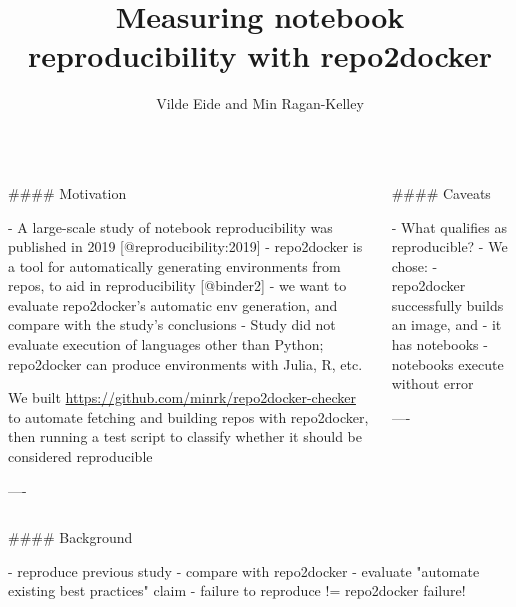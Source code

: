 \documentclass{beamer}
\author[]{Vilde Eide and Min Ragan-Kelley}
\institute[simula]{Simula Research Laboratory}
\title{Measuring notebook reproducibility with repo2docker}
\begin{document}
\begin{frame}[fragile]\centering

\begin{columns}
\begin{column}{0.57\textwidth}

\begin{markdown}

#### Motivation


- A large-scale study of notebook reproducibility was published in 2019 [@reproducibility:2019]
- repo2docker is a tool for automatically generating environments from repos, to aid in reproducibility [@binder2]
- we want to evaluate repo2docker's automatic env generation,
  and compare with the study's conclusions
- Study did not evaluate execution of languages other than Python;
  repo2docker can produce environments with Julia, R, etc.

We built \url{https://github.com/minrk/repo2docker-checker} to automate
fetching and building repos with repo2docker, then running a test script
to classify whether it should be considered reproducible


----
\end{markdown}
\end{column}

\begin{column}{.4\textwidth}
\begin{markdown}


#### Caveats


- What qualifies as reproducible?
- We chose:
    - repo2docker successfully builds an image, and
        - it has notebooks
        - notebooks execute without error

----
\end{markdown}
\end{column}

\end{columns}

\bigskip
{\hrulefill}
\bigskip

\begin{columns}[T]

\begin{column}{.46\textwidth}

\begin{markdown}

#### Background

- reproduce previous study
- compare with repo2docker
- evaluate "automate existing best practices" claim
- failure to reproduce != repo2docker failure!


\end{markdown}
\end{column}
\end{columns}
\end{frame}
\end{document}

